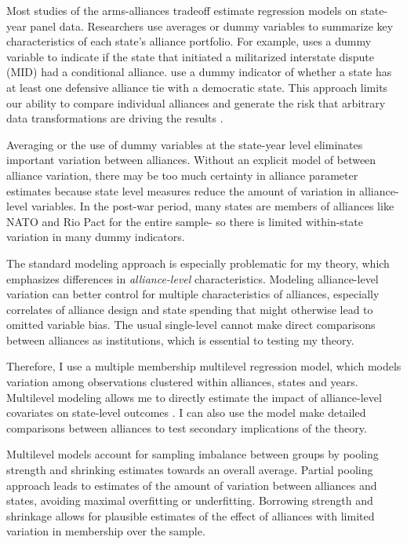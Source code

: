 \documentclass[12pt]{article}
\begin{document}
Most studies of the arms-alliances tradeoff estimate regression models on state-year panel data. Researchers use averages or dummy variables to summarize key characteristics of each state's alliance portfolio. For example, \citet{Benson2012} uses a dummy variable to indicate if the state that initiated a militarized interstate dispute (MID) had a conditional alliance. \citet{DigiuseppePoast2016} use a dummy indicator of whether a state has at least one defensive alliance tie with a democratic state. This approach limits our ability to compare individual alliances and generate the risk that arbitrary data transformations are driving the results \citep{GelmanLoken2013}. 

Averaging or the use of dummy variables at the state-year level eliminates important variation between alliances. Without an explicit model of between alliance variation, there may be too much certainty in alliance parameter estimates \citep{McElreath2016} because state level measures reduce the amount of variation in alliance-level variables. In the post-war period, many states are members of alliances like NATO and Rio Pact for the entire sample- so there is limited within-state variation in many dummy indicators. 

The standard modeling approach is especially problematic for my theory, which emphasizes differences in \textit{alliance-level} characteristics. Modeling alliance-level variation can better control for multiple characteristics of alliances, especially correlates of alliance design and state spending that might otherwise lead to omitted variable bias. The usual single-level cannot make direct comparisons between alliances as institutions, which is essential to testing my theory. 

Therefore, I use a multiple membership multilevel regression model, which models variation among observations clustered within alliances, states and years. Multilevel modeling allows me to directly estimate the impact of alliance-level covariates on state-level outcomes \citep{GelmanHill2007}. I can also use the model make detailed comparisons between alliances to test secondary implications of the theory. 

Multilevel models account for sampling imbalance between groups by pooling strength and shrinking estimates towards an overall average. Partial pooling approach leads to estimates of the amount of variation between alliances and states, avoiding maximal overfitting or underfitting. Borrowing strength and shrinkage allows for plausible estimates of the effect of alliances with limited variation in membership over the sample. 
\end{document}
